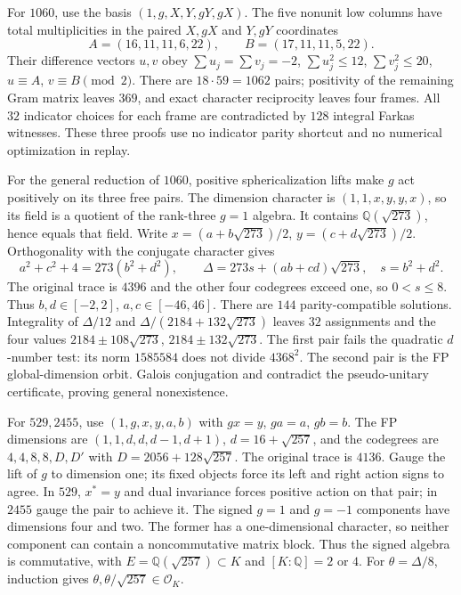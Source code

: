 For $1060$, use the basis $(1,g,X,Y,gY,gX)$.
The five nonunit low columns have total multiplicities in the paired
$X,gX$ and $Y,gY$ coordinates
\[
 A=(16,11,11,6,22),\qquad B=(17,11,11,5,22).
\]
Their difference vectors $u,v$ obey
$\sum u_j=\sum v_j=-2$, $\sum u_j^2\le12$,
$\sum v_j^2\le20$, $u\equiv A$, $v\equiv B\pmod2$.
There are $18\cdot59=1062$ pairs; positivity of the remaining Gram
matrix leaves $369$, and exact character reciprocity leaves four
frames. All $32$ indicator choices for each frame are contradicted by
$128$ integral Farkas witnesses. These three proofs use no indicator
parity shortcut and no numerical optimization in replay.

For the general reduction of $1060$, positive sphericalization lifts
make $g$ act positively on its three free pairs. The dimension character
is $(1,1,x,y,y,x)$, so its field is a quotient of the rank-three
$g=1$ algebra. It contains $\mathbb Q(\sqrt{273})$, hence equals that
field. Write $x=(a+b\sqrt{273})/2$, $y=(c+d\sqrt{273})/2$.
Orthogonality with the conjugate character gives
\[
 a^2+c^2+4=273(b^2+d^2),\qquad
 \Delta=273s+(ab+cd)\sqrt{273},\quad s=b^2+d^2.
\]
The original trace is $4396$ and the other four codegrees exceed one,
so $0<s\le8$. Thus $b,d\in[-2,2]$, $a,c\in[-46,46]$.
There are $144$ parity-compatible solutions. Integrality of
$\Delta/12$ and $\Delta/(2184+132\sqrt{273})$ leaves $32$ assignments
and the four values $2184\pm108\sqrt{273}$,
$2184\pm132\sqrt{273}$. The first pair fails the quadratic
$d$-number test: its norm $1585584$ does not divide $4368^2$.
The second pair is the FP global-dimension orbit. Galois conjugation
and \cite[Proposition~8.23]{ENO} contradict the pseudo-unitary
certificate, proving general nonexistence.

For $529,2455$, use $(1,g,x,y,a,b)$ with $gx=y$, $ga=a$, $gb=b$.
The FP dimensions are $(1,1,d,d,d-1,d+1)$, $d=16+\sqrt{257}$,
and the codegrees are $4,4,8,8,D,D'$ with
$D=2056+128\sqrt{257}$. The original trace is $4136$.
Gauge the lift of $g$ to dimension one; its fixed objects force its
left and right action signs to agree. In $529$, $x^*=y$ and dual
invariance forces positive action on that pair; in $2455$ gauge the
pair to achieve it. The signed $g=1$ and $g=-1$ components have
dimensions four and two. The former has a one-dimensional character,
so neither component can contain a noncommutative matrix block.
Thus the signed algebra is commutative, with $E=\mathbb Q(\sqrt{257})
\subset K$ and $[K:\mathbb Q]=2$ or $4$.
For $\theta=\Delta/8$, induction gives
$\theta,\theta/\sqrt{257}\in\mathcal O_K$.

